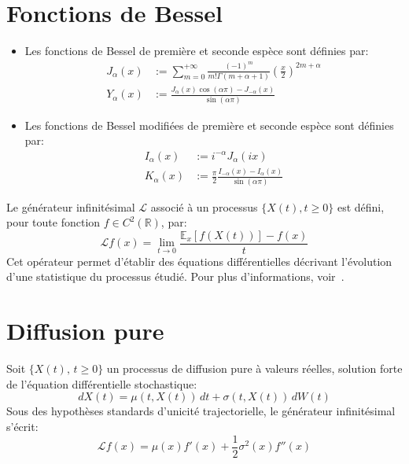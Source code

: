 \section*{Fonctions de Bessel}
\begin{itemize}
    \item Les fonctions de Bessel de première et seconde espèce sont définies par:
    \[
    \begin{aligned}
        J_\alpha(x)&:=\sum_{m=0}^{+\infty}\frac{(-1)^m}{m!\Gamma(m+\alpha+1)}{\left(\frac{x}{2}\right)}^{2m+\alpha} \\
        Y_\alpha(x)&:=\frac{J_\alpha(x)\cos(\alpha\pi)-J_{-\alpha}(x)}{\sin(\alpha\pi)}
    \end{aligned}
    \]
    \item Les fonctions de Bessel modifiées de première et seconde espèce sont définies par:
    \[
    \begin{aligned}
        I_\alpha(x)&:=i^{-\alpha}J_\alpha(ix)\\
        K_\alpha(x)&:=\frac{\pi}{2}\frac{I_{-\alpha}(x)-I_\alpha(x)}{\sin(\alpha\pi)}
    \end{aligned}
    \]
\end{itemize}

\label{infinitesimal_generator}

Le générateur infinitésimal \( \mathcal{L} \) associé à un processus \( \{X(t), t\geq0\} \) est défini, pour toute fonction \( f \in C^2(\mathds{R}) \), par:
\[
    \mathcal{L}f(x) = \lim_{t \to 0} \frac{\mathds{E}_x[f(X(t))] - f(x)}{t}
\]
Cet opérateur permet d'établir des équations différentielles décrivant l'évolution d'une statistique du processus étudié. Pour plus d'informations, voir~\cite{bakry2014}.

\section*{Diffusion pure}

Soit \( \{X(t),\, t \geq 0\} \) un processus de diffusion pure à valeurs réelles, solution forte de l'équation différentielle stochastique:
\begin{equation}\label{diffusion_sde}
    dX(t) = \mu(t,X(t))\,dt + \sigma(t,X(t))\,dW(t)
\end{equation}
Sous des hypothèses standards d'unicité trajectorielle, le générateur infinitésimal s'écrit:
\[
    \mathcal{L}f(x) = \mu(x) f'(x) + \frac{1}{2} \sigma^2(x) f''(x)
\]

